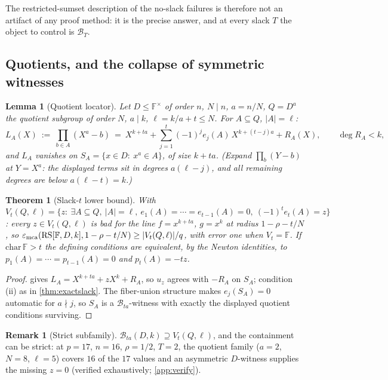 \documentclass[11pt]{article}
\newtheorem{theorem}{Theorem}[section]
\newtheorem{lemma}[lemma]{Lemma}
\theoremstyle{definition}
\newtheorem{remark}[remark]{Remark}
\newcommand{\F}{\mathbb F}
\newcommand{\eps}{\varepsilon}
\newcommand{\RS}{\mathrm{RS}}
\newcommand{\emca}{\eps_{\rm mca}}
\begin{document}
The restricted-sumset description of the no-slack failures is therefore not an artifact of any proof method: it is the precise answer, and at every slack $T$ the object to control is $\mathcal B_T$.

\subsection{Quotients, and the collapse of symmetric witnesses}

\begin{lemma}[Quotient locator]\label{lem:tlocator}
Let $D\le\F^\times$ of order $n$, $N\mid n$, $a=n/N$, $Q=D^a$ the quotient subgroup of order $N$, $a\mid k$, $\ell=k/a+t\le N$.  For $A\subseteq Q$, $|A|=\ell$:
\[
        L_A(X)\ :=\ \prod_{b\in A}(X^a-b)\ =\ X^{k+ta}+\sum_{j=1}^t(-1)^je_j(A)\,X^{k+(t-j)a}+R_A(X),
        \qquad\deg R_A<k,
\]
and $L_A$ vanishes on $S_A=\{x\in D:\ x^a\in A\}$, of size $k+ta$.  (Expand $\prod_b(Y-b)$ at $Y=X^a$: the displayed terms sit in degrees $a(\ell-j)$, and all remaining degrees are below $a(\ell-t)=k$.)
\end{lemma}

\begin{theorem}[Slack-$t$ lower bound]\label{thm:slackt}
With $V_t(Q,\ell)=\{z:\ \exists A\subseteq Q,\ |A|=\ell,\ e_1(A)=\cdots=e_{t-1}(A)=0,\ (-1)^te_t(A)=z\}$: every $z\in V_t(Q,\ell)$ is bad for the line $f=x^{k+ta}$, $g=x^k$ at radius $1-\rho-t/N$, so $\emca(\RS[\F,D,k],1-\rho-t/N)\ge|V_t(Q,\ell)|/q$, with error one when $V_t=\F$.  If $\mathrm{char}\,\F>t$ the defining conditions are equivalent, by the Newton identities, to $p_1(A)=\cdots=p_{t-1}(A)=0$ and $p_t(A)=-tz$.
\end{theorem}

\begin{proof}
 gives $L_A=X^{k+ta}+zX^k+R_A$, so $u_z$ agrees with $-R_A$ on $S_A$; condition (ii) as in \cref{thm:exactslack}.  The fiber-union structure makes $e_j(S_A)=0$ automatic for $a\nmid j$, so $S_A$ is a $\mathcal B_{ta}$-witness with exactly the displayed quotient conditions surviving.
\end{proof}

\begin{remark}[Strict subfamily]\label{rem:strict}
$\mathcal B_{ta}(D,k)\supseteq V_t(Q,\ell)$, and the containment can be strict: at $p=17$, $n=16$, $\rho=1/2$, $T=2$, the quotient family ($a=2$, $N=8$, $\ell=5$) covers $16$ of the $17$ values and an asymmetric $D$-witness supplies the missing $z=0$ (verified exhaustively; \cref{app:verify}).
\end{remark}
\end{document}
